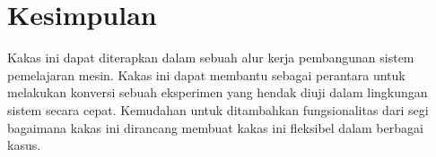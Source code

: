\section{Kesimpulan}

Kakas ini dapat diterapkan dalam sebuah alur kerja pembangunan sistem pemelajaran mesin.
Kakas ini dapat membantu sebagai perantara untuk melakukan konversi sebuah eksperimen yang hendak diuji dalam lingkungan sistem secara cepat.
Kemudahan untuk ditambahkan fungsionalitas dari segi bagaimana kakas ini dirancang membuat kakas ini fleksibel dalam berbagai kasus.